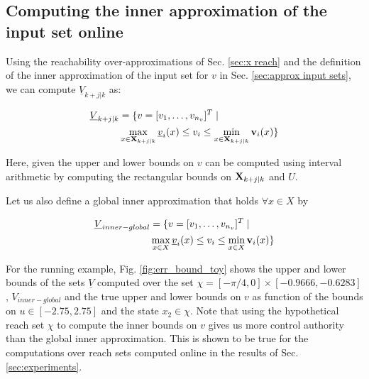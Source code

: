 \subsection{Computing the inner approximation of the input set online}

Using the reachability over-approximations of Sec. \ref{sec:x reach} and the definition of the inner approximation of the input set for $v$ in Sec. \ref{sec:approx input sets}, we can compute $\underline{V}_{k+j|k}$ as:

\begin{subequations}
\begin{align}
\underline{V}_{k+j|k} &= \{v=[v_1,\ldots,v_{n_v}]^T \;|\; \nonumber \\
&\max_{x\in \mathbf{X}_{k+j|k}} \underline{v}_i(x)  \leq v_i \leq \min_{x \in \mathbf{X}_{k+j|k}} \mathbf{v}_i(x) \} 
\end{align}
\end{subequations}

Here, given the upper and lower bounds on $v$ can be computed using interval arithmetic by computing the rectangular bounds on $\mathbf{X}_{k+j|k}$ and $U$. 

Let us also define a global inner approximation that holds $\forall x \in X$ by 

\begin{subequations}
\begin{align}
\underline{V}_{inner-global} &= \{v=[v_1,\ldots,v_{n_v}]^T \;|\; \nonumber \\
&\max_{x\in X} \underline{v}_i(x)  \leq v_i \leq \min_{x \in X} \mathbf{v}_i(x) \} 
\end{align}
\end{subequations}

For the running example, Fig. \ref{fig:err_bound_toy} shows the upper and lower bounds of the sets $\underline{V}$ computed over the set  $\chi = [-\pi/4,0]\times[-0.9666,-0.6283]$, $V_{inner-global}$ and the true upper and lower bounds on $v$ as function of the bounds on $u \in [-2.75,2.75] $ and the state $x_2 \in \chi$. Note that using the hypothetical reach set $\chi$ to compute the inner bounds on $v$ gives us more control authority than the global inner approximation. This is shown to be true for the computations over reach sets computed online in the results of Sec. \ref{sec:experiments}.

